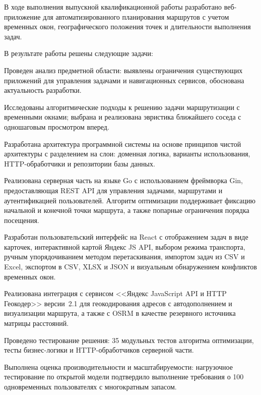 \Conclusion %

В ходе выполнения выпускной квалификационной работы разработано
веб-приложение для автоматизированного планирования маршрутов с учетом
временных окон, географического положения точек и длительности выполнения
задач.

В результате работы решены следующие задачи:

\begin{compactlistdot}
      \item Проведен анализ предметной области: выявлены ограничения
            существующих приложений для управления задачами и навигационных
            сервисов, обоснована актуальность разработки.
      \item Исследованы алгоритмические подходы к решению задачи
            маршрутизации с временными окнами; выбрана и реализована
            эвристика ближайшего соседа с одношаговым просмотром вперед.
      \item Разработана архитектура программной системы на основе
            принципов чистой архитектуры с разделением на слои: доменная
            логика, варианты использования, HTTP-обработчики и репозитории
            базы данных.
      \item Реализована серверная часть на языке Go с использованием
            фреймворка Gin, предоставляющая REST API для управления
            задачами, маршрутами и аутентификацией пользователей. Алгоритм
            оптимизации поддерживает фиксацию начальной и конечной точки
            маршрута, а также попарные ограничения порядка посещения.
      \item Разработан пользовательский интерфейс на React с отображением
            задач в виде карточек, интерактивной картой Яндекс JS API,
            выбором режима транспорта, ручным упорядочиванием методом
            перетаскивания, импортом задач из CSV и Excel, экспортом
            в CSV, XLSX и JSON и визуальным обнаружением конфликтов
            временных окон.
      \item Реализована интеграция с сервисом <<Яндекс JavaScript API
            и HTTP Геокодер>> версии~2.1 для геокодирования адресов
            с автодополнением и визуализации маршрута, а также с OSRM
            в качестве резервного источника матрицы расстояний.
      \item Проведено тестирование решения: 35 модульных тестов алгоритма
            оптимизации, тесты бизнес-логики и HTTP-обработчиков серверной
            части.
      \item Выполнена оценка производительности и масштабируемости:
            нагрузочное тестирование по открытой модели подтвердило выполнение
            требования о 100 одновременных пользователях с многократным запасом.
\end{compactlistdot}

